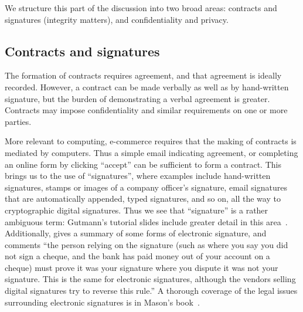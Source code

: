 \documentclass{article}
\def\citeN{\citet}
\def\cite{\citep}
\begin{document}
We structure this part of the discussion into two broad areas: contracts and signatures (integrity matters), and confidentiality and privacy.

\subsection{Contracts and signatures}\label{sec:contractsSignatures}

The formation of contracts
requires agreement, and that agreement is ideally recorded.
However, a contract can be made verbally as well as by hand-written
signature, but the burden of demonstrating a verbal agreement is greater.  
Contracts may impose confidentiality and similar
requirements on one or more parties.  

More relevant to computing, e-commerce requires that the making of
contracts is mediated by computers.  Thus a simple email indicating
agreement, or completing an online form by clicking ``accept'' can be
sufficient to form a contract.  This brings us to the use of
``signatures'', where examples include hand-written signatures, stamps
or images of a company officer's signature, email signatures that are
automatically appended, typed signatures, and so on, all the way to
cryptographic digital signatures.  Thus we see that ``signature'' is
a rather ambiguous term:  Gutmann's tutorial slides include greater
detail in this
area~\cite{mGutmann1}.
Additionally, \citeN{mMason1} gives a summary of some forms of electronic
signature, and comments ``the person relying on the signature (such as
where you say you did not sign a cheque, and the bank has paid money
out of your account on a cheque) must prove it was your signature
where you dispute it was not your signature. This is the same for
electronic signatures, although the vendors selling digital signatures
try to reverse this rule.''  
A thorough coverage of the legal issues surrounding electronic signatures is in Mason's book~\cite{Mason12}.
\end{document}
